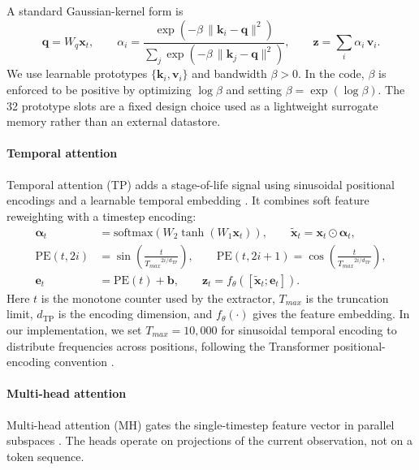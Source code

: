 \documentclass[sn-basic]{sn-jnl}%
\begin{document}
A standard Gaussian-kernel form is
\begin{equation}
        \mathbf{q}=W_q\mathbf{x}_t,\qquad
        \alpha_i = \frac{\exp\left(-\beta\,\lVert \mathbf{k}_i-\mathbf{q}\rVert^2\right)}{\sum_j \exp\left(-\beta\,\lVert \mathbf{k}_j-\mathbf{q}\rVert^2\right)},
        \qquad \mathbf{z}=\sum_i\alpha_i\,\mathbf{v}_i.
\end{equation}
We use learnable prototypes $\{\mathbf{k}_i,\mathbf{v}_i\}$ and bandwidth $\beta>0$. In the code, $\beta$ is enforced to be positive by optimizing $\log \beta$ and setting $\beta=\exp(\log \beta)$. The 32 prototype slots are a fixed design choice used as a lightweight surrogate memory rather than an external datastore.

\paragraph{Temporal attention}
Temporal attention (TP) adds a stage-of-life signal using sinusoidal positional encodings and a learnable temporal embedding \cite{Vaswani2017, Lim2020TFT}. It combines soft feature reweighting with a timestep encoding:
\begin{align}
	\boldsymbol{\alpha}_t &= \mathrm{softmax}\!\left(W_2\tanh\!\left(W_1\mathbf{x}_t\right)\right),
        \qquad \tilde{\mathbf{x}}_t = \mathbf{x}_t\odot\boldsymbol{\alpha}_t,\\
        \mathrm{PE}(t,2i) &= \sin\!\left(\frac{t}{{T_{max}}^{2i/d_{\mathrm{TP}}}}\right),
        \qquad \mathrm{PE}(t,2i+1)=\cos\!\left(\frac{t}{{T_{max}}^{2i/d_{\mathrm{TP}}}}\right),\\
        \mathbf{e}_t &= \mathrm{PE}(t) + \mathbf{b},
        \qquad \mathbf{z}_t = f_\theta\!\left([\tilde{\mathbf{x}}_t;\mathbf{e}_t]\right).
\end{align}
Here $t$ is the monotone counter used by the extractor, $T_{max}$ is the truncation limit, $d_{\mathrm{TP}}$ is the encoding dimension, and $f_\theta(\cdot)$ gives the feature embedding. In our implementation, we set $T_{max}=10{,}000$ for sinusoidal temporal encoding to distribute frequencies across positions, following the Transformer positional-encoding convention \cite{Vaswani2017}.

\paragraph{Multi-head attention}
Multi-head attention (MH) gates the single-timestep feature vector in parallel subspaces \cite{Vaswani2017}. The heads operate on projections of the current observation, not on a token sequence.
\end{document}
